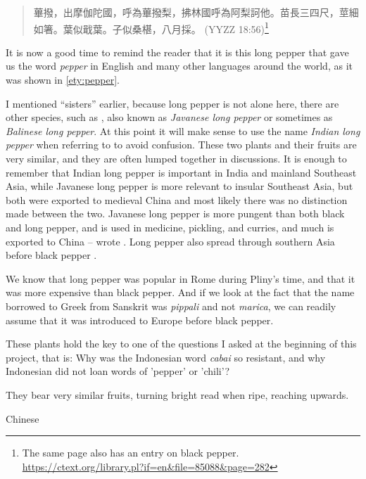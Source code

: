 \begin{quote}
    蓽撥，出摩伽陀國，呼為蓽撥梨，拂林國呼為阿梨訶他。苗長三四尺，莖細如箸。葉似戢葉。子似桑椹，八月採。 (YYZZ 18:56)\footnote{The same page also has an entry on black pepper. \url{https://ctext.org/library.pl?if=en&file=85088&page=282}}
\end{quote}


It is now a good time to remind the reader that it is this long pepper that gave us the word \textit{pepper} in English and many other languages around the world, as it was shown in \ref{ety:pepper}. 

I mentioned ``sisters'' earlier, because long pepper is not alone here, there are other species, such as , also known as \textit{Javanese long pepper} or sometimes as \textit{Balinese long pepper}. At this point it will make sense to use the name \textit{Indian long pepper} when referring to  to avoid confusion. These two plants and their fruits are very similar, and they are often lumped together in discussions. It is enough to remember that Indian long pepper is important in India and mainland Southeast Asia, while Javanese long pepper is more relevant to insular Southeast Asia, but both were exported to medieval China and most likely there was no distinction made between the two. Javanese long pepper is more pungent than both black and long pepper, and is used in medicine, pickling, and curries, and much is exported to China -- wrote \textcite{burkill_dictionary_1935}. Long pepper also spread through southern Asia before black pepper \parencite[1746-1751]{burkill_dictionary_1935}. 

We know that long pepper was popular in Rome during Pliny's time, and that it was more expensive than black pepper. And if we look at the fact that the name borrowed to Greek from Sanskrit was \textit{pippali} and not \textit{marica}, we can readily assume that it was introduced to Europe before black pepper.

These plants hold the key to one of the questions I asked at the beginning of this project, that is: Why was the Indonesian word \textit{cabai} so resistant, and why Indonesian did not loan words of 'pepper' or 'chili'?  


They bear very similar fruits, turning bright read when ripe, reaching upwards.  



Chinese
